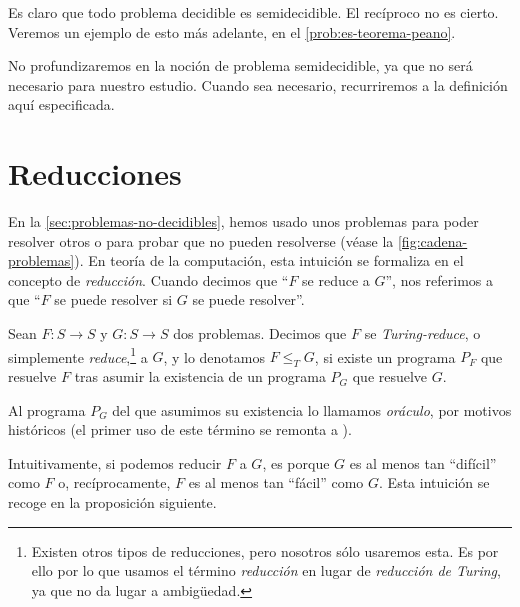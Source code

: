 Es claro que todo problema decidible es semidecidible. El recíproco no es cierto. Veremos un ejemplo de esto más adelante, en el \cref{prob:es-teorema-peano}.

No profundizaremos en la noción de problema semidecidible, ya que no será necesario para nuestro estudio. Cuando sea necesario, recurriremos a la definición aquí especificada.

\section{Reducciones}\label{sec:reducciones}

En la \cref{sec:problemas-no-decidibles}, hemos usado unos problemas para poder resolver otros o para probar que no pueden resolverse (véase la \cref{fig:cadena-problemas}). En teoría de la computación, esta intuición se formaliza en el concepto de \emph{reducción}. Cuando decimos que ``$F$ se reduce a $G$'', nos referimos a que ``$F$ se puede resolver si $G$ se puede resolver''.

\begin{definicion}\label{def:reduccion}
Sean $F:S\longrightarrow S$ y $G:S\longrightarrow S$ dos problemas. Decimos que $F$ se \emph{Turing-reduce}, o simplemente \emph{reduce},\footnote{Existen otros tipos de reducciones, pero nosotros sólo usaremos esta. Es por ello por lo que usamos el término \emph{reducción} en lugar de \emph{reducción de Turing}, ya que no da lugar a ambigüedad.} a $G$, y lo denotamos $F \leq_T G$, si existe un programa $P_F$ que resuelve $F$ tras asumir la existencia de un programa $P_G$ que resuelve $G$.
\end{definicion}

Al programa $P_G$ del que asumimos su existencia lo llamamos \emph{oráculo}, por motivos históricos (el primer uso de este término se remonta a \cite{Howden1978}). 


Intuitivamente, si podemos reducir $F$ a $G$, es porque $G$ es al menos tan ``difícil'' como $F$ o, recíprocamente, $F$ es al menos tan ``fácil'' como $G$. Esta intuición se recoge en la proposición siguiente.

